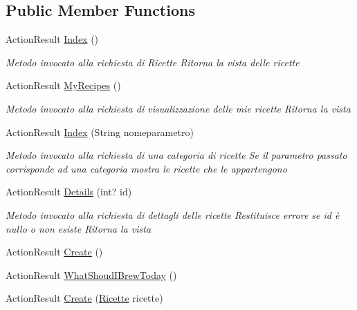 \subsection*{Public Member Functions}
\begin{DoxyCompactItemize}
\item 
Action\+Result \mbox{\hyperlink{class_brew_day2_1_1_controllers_1_1_ricette_controller_af44eaada103e9c50fca11811298d8bc8}{Index}} ()
\begin{DoxyCompactList}\small\item\em Metodo invocato alla richiesta di Ricette Ritorna la vista delle ricette \end{DoxyCompactList}\item 
Action\+Result \mbox{\hyperlink{class_brew_day2_1_1_controllers_1_1_ricette_controller_aa20670e970ff9a0141080d4d09d63ecd}{My\+Recipes}} ()
\begin{DoxyCompactList}\small\item\em Metodo invocato alla richiesta di visualizzazione delle mie ricette Ritorna la vista \end{DoxyCompactList}\item 
Action\+Result \mbox{\hyperlink{class_brew_day2_1_1_controllers_1_1_ricette_controller_aea9a165c737ac4b7e272284161296968}{Index}} (String nomeparametro)
\begin{DoxyCompactList}\small\item\em Metodo invocato alla richiesta di una categoria di ricette Se il parametro passato corrisponde ad una categoria mostra le ricette che le appartengono \end{DoxyCompactList}\item 
Action\+Result \mbox{\hyperlink{class_brew_day2_1_1_controllers_1_1_ricette_controller_a24c992c1f4be3d406b27d6a8fb46dbda}{Details}} (int? id)
\begin{DoxyCompactList}\small\item\em Metodo invocato alla richiesta di dettagli delle ricette Restituisce errore se id è nullo o non esiste Ritorna la vista \end{DoxyCompactList}\item 
Action\+Result \mbox{\hyperlink{class_brew_day2_1_1_controllers_1_1_ricette_controller_adf49494bb34b562e36b5c64852c642e0}{Create}} ()
\item 
Action\+Result \mbox{\hyperlink{class_brew_day2_1_1_controllers_1_1_ricette_controller_abe2a5a4ebd4f966411eb313576afa5c7}{What\+Shoud\+I\+Brew\+Today}} ()
\item 
Action\+Result \mbox{\hyperlink{class_brew_day2_1_1_controllers_1_1_ricette_controller_a9a3bcf974c5617407eb6838bfc8a695f}{Create}} (\mbox{\hyperlink{class_brew_day2_1_1_models_1_1_ricette}{Ricette}} ricette)

\end{DoxyCompactItemize}
